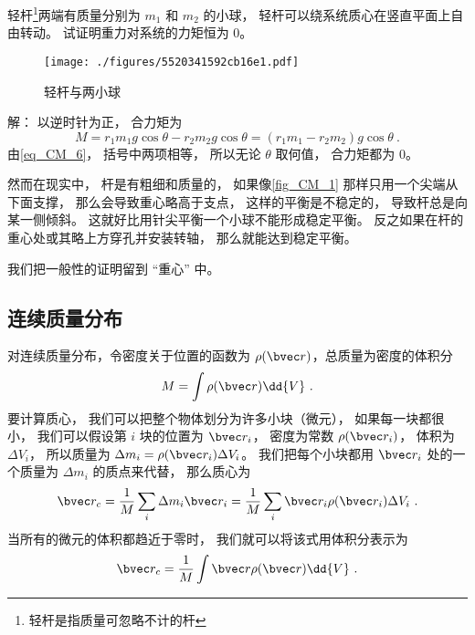 \begin{example}{}\label{ex_CM_1}
轻杆\footnote{轻杆是指质量可忽略不计的杆}两端有质量分别为 $m_1$ 和 $m_2$ 的小球， 轻杆可以绕系统质心在竖直平面上自由转动。 试证明重力对系统的力矩恒为 0。

\begin{figure}[ht]
\centering
\texttt{[image: ./figures/5520341592cb16e1.pdf]}
\caption{轻杆与两小球} \label{fig_CM_1}
\end{figure}

解： 以逆时针为正， 合力矩为
\begin{equation}
M = r_1 m_1 g \cos\theta - r_2 m_2 g \cos\theta = (r_1 m_1 - r_2 m_2) g \cos\theta~.
\end{equation}
由\autoref{eq_CM_6}， 括号中两项相等， 所以无论 $\theta$ 取何值， 合力矩都为 0。

然而在现实中， 杆是有粗细和质量的， 如果像\autoref{fig_CM_1} 那样只用一个尖端从下面支撑， 那么会导致重心略高于支点， 这样的平衡是不稳定的， 导致杆总是向某一侧倾斜。 这就好比用针尖平衡一个小球不能形成稳定平衡。 反之如果在杆的重心处或其略上方穿孔并安装转轴， 那么就能达到稳定平衡。
\end{example}
我们把一般性的证明留到 “重心” 中。

\subsection{连续质量分布}

对连续质量分布，令密度关于位置的函数为 $\rho (\bvec r)$，总质量为密度的体积分 %
\begin{equation}
M = \int \rho (\bvec r) \dd{V}~.
\end{equation}
要计算质心， 我们可以把整个物体划分为许多小块（微元）， 如果每一块都很小， 我们可以假设第 $i$ 块的位置为 $\bvec r_i$， 密度为常数 $\rho(\bvec r_i)$， 体积为 $\Delta V_i$， 所以质量为 $\Delta m_i = \rho(\bvec r_i) \Delta V_i$。 我们把每个小块都用 $\bvec r_i$ 处的一个质量为 $\Delta m_i$ 的质点来代替， 那么质心为
\begin{equation}
\bvec r_c = \frac{1}{M} \sum_i \Delta m_i \bvec r_i = \frac{1}{M} \sum_i \bvec r_i \rho(\bvec r_i) \Delta V_i~.
\end{equation}
当所有的微元的体积都趋近于零时， 我们就可以将该式用体积分表示为
\begin{equation}\label{eq_CM_9}
\bvec r_c = \frac{1}{M}\int \bvec r\rho (\bvec r) \dd{V}~.
\end{equation}

